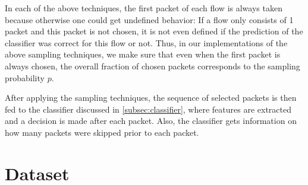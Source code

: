 \documentclass[conference]{IEEEtran}
\newcommand\note[2]{{\color{#1}#2}}
\begin{document}
In each of the above techniques, the first packet of each flow is always taken because otherwise one could get undefined behavior: If a flow only consists of 1 packet and this packet is not chosen, it is not even defined if the prediction of the classifier was correct for this flow or not. Thus, in our implementations of the above sampling techniques, we make sure that even when the first packet is always chosen, the overall fraction of chosen packets corresponds to the sampling probability $p$.

After applying the sampling techniques, the sequence of selected packets is then fed to the classifier discussed in \autoref{subsec:classifier}, where features are extracted and a decision is made after each packet. Also, the classifier gets information on how many packets were skipped prior to each packet.


\section{Dataset}


\end{document}
